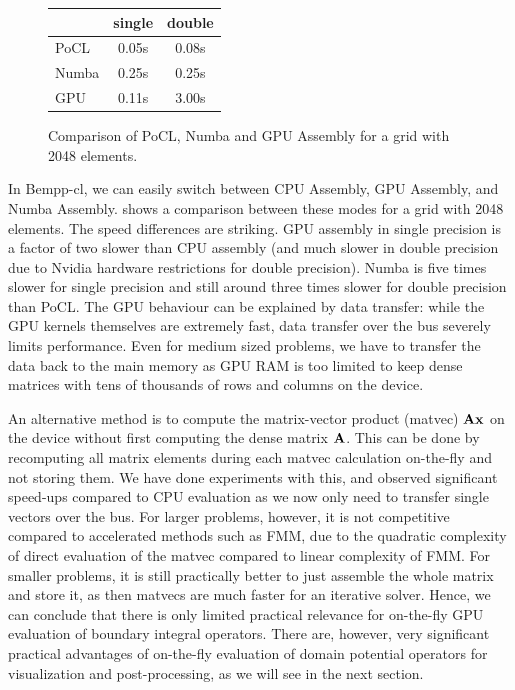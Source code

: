 \begin{figure}
\begin{center}
\begin{tabular}{l|c|c}
	        &   single      &    double\\
	        \hline
	 PoCL   &   0.05s       &    0.08s\\
	 Numba  &   0.25s       &    0.25s\\
	 GPU    &   0.11s       &    3.00s\\
\end{tabular}
\end{center}
\caption{Comparison of PoCL, Numba and GPU Assembly for a grid with 2048 elements.}
\label{fig:cpu_gpu_numba_compare}
\end{figure}
In Bempp-cl, we can easily switch between CPU Assembly, GPU Assembly, and Numba Assembly.  shows a comparison between these modes for a grid with 2048 elements. The speed differences are striking. GPU assembly in single precision is a factor of two slower than CPU assembly (and much slower in double precision due to Nvidia hardware restrictions for double precision). Numba is five times slower for single precision and still around three times slower for double precision than PoCL. The GPU behaviour can be explained by data transfer: while the GPU kernels themselves are extremely fast, data transfer over the bus severely limits performance. Even for medium sized problems, we have to transfer the data back to the main memory as GPU RAM is too limited to keep dense matrices with tens of thousands of rows and columns on the device.

An alternative method is to compute the matrix-vector product (matvec) $\mathbf{A}\mathbf{x}$ on the device without first computing the dense matrix $\mathbf{A}$. This can be done by recomputing all matrix elements during each matvec calculation on-the-fly and not storing them. We have done experiments with this, and observed significant speed-ups compared to CPU evaluation as we now only need to transfer single vectors over the bus. For larger problems, however, it is not competitive compared to accelerated methods such as FMM, due to the quadratic complexity of direct evaluation of the matvec compared to linear complexity of FMM. For smaller problems, it is still practically better to just assemble the whole matrix and store it, as then matvecs are much faster for an iterative solver. Hence, we can conclude that there is only limited practical relevance for on-the-fly GPU evaluation of boundary integral operators. There are, however, very significant practical advantages of on-the-fly evaluation of domain potential operators for visualization and post-processing, as we will see in the next section.

